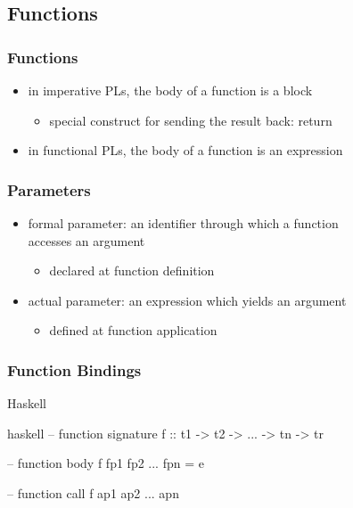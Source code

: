 \documentclass[dvipsnames]{beamer}
\theoremstyle{plain}
\begin{document}
\subsection{Functions}

\begin{frame}
  \frametitle{Functions}

  \begin{itemize}
    \item in imperative PLs, the body of a function is a block
    \begin{itemize}
      \item special construct for sending the result back: \alert{return}
    \end{itemize}

    \pause
    \bigskip
    \item in functional PLs, the body of a function is an expression
  \end{itemize}
\end{frame}

\begin{frame}
  \frametitle{Parameters}

  \begin{itemize}
    \item \alert{formal parameter}: an identifier through which a function\\
      accesses an argument
    \begin{itemize}
      \item declared at function definition
    \end{itemize}

    \pause
    \medskip
    \item \alert{actual parameter}: an expression which yields an argument
    \begin{itemize}
      \item defined at function application
    \end{itemize}
  \end{itemize}
\end{frame}

\begin{frame}[fragile]
  \frametitle{Function Bindings}

  \begin{block}{Haskell}
    \begin{pygments}{haskell}
-- function signature
f :: t1 -> t2 -> ... -> tn -> tr

-- function body
f fp1 fp2 ... fpn = e

-- function call
f ap1 ap2 ... apn
    \end{pygments}
  \end{block}
\end{frame}
\end{document}
